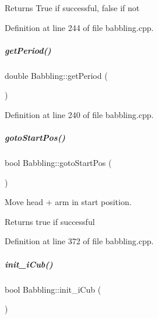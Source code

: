 \begin{DoxyReturn}{Returns}
True if successful, false if not 
\end{DoxyReturn}


Definition at line 244 of file babbling.\+cpp.

\mbox{\label{group__babbling_a902a318d5b14fcf5a19bb7272abd49e2}} 
\subparagraph{\texorpdfstring{get\+Period()}{getPeriod()}}
{\footnotesize\ttfamily double Babbling\+::get\+Period (\begin{DoxyParamCaption}{ }\end{DoxyParamCaption})}



Definition at line 240 of file babbling.\+cpp.

\mbox{\label{group__babbling_ac34e8d2ad42bdf8d98b5dc155d2f42dd}} 
\subparagraph{\texorpdfstring{goto\+Start\+Pos()}{gotoStartPos()}}
{\footnotesize\ttfamily bool Babbling\+::goto\+Start\+Pos (\begin{DoxyParamCaption}{ }\end{DoxyParamCaption})\hspace{0.3cm}{\ttfamily [protected]}}



Move head + arm in start position. 

\begin{DoxyReturn}{Returns}
true if successful 
\end{DoxyReturn}


Definition at line 372 of file babbling.\+cpp.

\mbox{\label{group__babbling_aa4c8a1232df2582bc87b3da1ae0cd6a3}} 
\subparagraph{\texorpdfstring{init\+\_\+i\+Cub()}{init\_iCub()}}
{\footnotesize\ttfamily bool Babbling\+::init\+\_\+i\+Cub (\begin{DoxyParamCaption}{ }\end{DoxyParamCaption})\hspace{0.3cm}{\ttfamily [protected]}}



